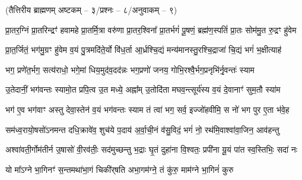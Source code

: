 

\vspace{-1ex}
\centerline{\normalsize(तैत्तिरीय ब्राह्मणम् अष्टकम् – ३/प्रश्नः – ८/अनुवाकम् – ९)}


\twolineshloka
{प्रा॒तर॒ग्निं प्रा॒तरिन्द्रꣳ॑ हवामहे प्रा॒तर्मि॒त्रा वरु॑णा प्रा॒तर॒श्विना᳚}
{प्रा॒तर्भगं॑ पू॒षणं॒ ब्रह्म॑ण॒स्पतिं॑ प्रा॒तः सोम॑मु॒त रु॒द्रꣳ हु॑वेम}

\twolineshloka
{प्रा॒त॒र्जितं॒ भग॑मु॒ग्रꣳ हु॑वेम व॒यं पु॒त्रमदि॑ते॒र्यो वि॑ध॒र्ता}
{आ॒र्ध्रश्चि॒द्यं मन्य॑मानस्तु॒रश्चि॒द्राजा॑ चि॒द्यं भगं॑ भ॒क्षीत्याह॑}

\twolineshloka
{भग॒ प्रणे॑त॒र्भग॒ सत्य॑राधो॒ भगे॒मां धिय॒मुद॑व॒दद॑न्नः}
{भग॒प्रणो॑ जनय॒ गोभि॒रश्वै॒र्भग॒प्रनृभि॑र्नृ॒वन्तः॑ स्याम}

\twolineshloka
{उ॒तेदानीं॒ भग॑वन्तः स्यामो॒त प्रपि॒त्व उ॒त मध्ये॒ अह्ना᳚म्}
{उ॒तोदि॑ता मघव॒न्त्सूर्य॑स्य व॒यं दे॒वानाꣳ॑ सुम॒तौ स्या॑म}

\twolineshloka
{भग॑ ए॒व भग॑वाꣳ अस्तु देवा॒स्तेन॑ व॒यं भग॑वन्तः स्याम}
{तं त्वा॑ भग॒ सर्व॒ इज्जो॑हवीमि॒ स नो॑ भग पुर ए॒ता भ॑वे॒ह}

\twolineshloka
{सम॑ध्व॒रायो॒षसो॑ऽनमन्त दधि॒क्रावे॑व॒ शुच॑ये प॒दाय॑}
{अ॒र्वा॒ची॒नं व॑सु॒विदं॒ भगं॑ नो॒ रथ॑मि॒वाश्वा॑वा॒जिन॒ आव॑हन्तु}

\twolineshloka
{अश्वा॑वती॒र्गोम॑तीर्न उ॒षासो॑ वी॒रव॑तीः॒ सद॑मुच्छन्तु भ॒द्राः}
{घृ॒तं दुहा॑ना वि॒श्वतः॒ प्रपी॑ना यू॒यं पा॑त स्व॒स्तिभिः॒ सदा॑ नः}

\twolineshloka
{यो मा᳚ऽग्ने भा॒गिनꣳ॑ स॒न्तमथा॑भा॒गं चिकी॑र्‌षति}
{अभा॒गम॑ग्ने॒ तं कु॑रु॒ माम॑ग्ने भा॒गिनं॑ कुरु}

